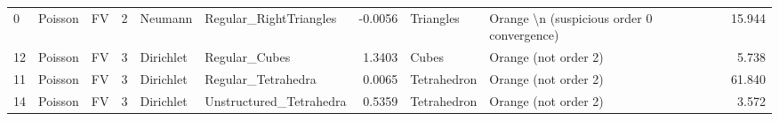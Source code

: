 \begin{tabular}{lllrllrllr}
0  &   Poisson &         FV &         2 &    Neumann &   Regular\_RightTriangles &       -0.0056 &      Triangles &  Orange \textbackslash n (suspicious order 0 convergence) &       15.944 \\
12 &   Poisson &         FV &         3 &  Dirichlet &            Regular\_Cubes &        1.3403 &          Cubes &                        Orange (not order 2) &        5.738 \\
11 &   Poisson &         FV &         3 &  Dirichlet &       Regular\_Tetrahedra &        0.0065 &    Tetrahedron &                        Orange (not order 2) &       61.840 \\
14 &   Poisson &         FV &         3 &  Dirichlet &  Unstructured\_Tetrahedra &        0.5359 &    Tetrahedron &                        Orange (not order 2) &        3.572 \\
\bottomrule
\end{tabular}

